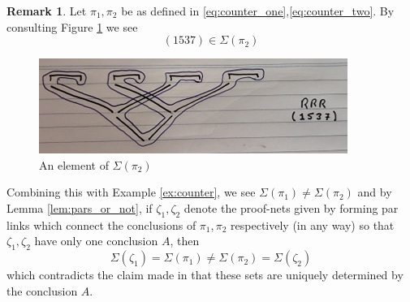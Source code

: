 \documentclass[12pt]{article}
\theoremstyle{plain}
\theoremstyle{definition}
\newtheorem{remark}[thm]{Remark}
\begin{document}
\begin{remark}
Let $\pi_1,\pi_2$ be as defined in \eqref{eq:counter_one},\eqref{eq:counter_two}. By consulting Figure \ref{fig:counter_two} we see
\begin{equation}
    (1537) \in \Sigma(\pi_2)
\end{equation}
\begin{figure}[h]
    \centering
    \includegraphics{counter_two.jpg}
    \caption{An element of $\Sigma(\pi_2)$}
    \label{fig:counter_two}
\end{figure}
Combining this with Example \ref{ex:counter}, we see $\Sigma(\pi_1) \neq \Sigma(\pi_2)$ and by Lemma \ref{lem:pars_or_not}, if $\zeta_1,\zeta_2$ denote the proof-nets given by forming par links which connect the conclusions of $\pi_1,\pi_2$ respectively (in any way) so that $\zeta_1,\zeta_2$ have only one conclusion $A$, then
\begin{equation}
    \Sigma(\zeta_1) = \Sigma(\pi_1) \neq \Sigma(\pi_2) = \Sigma(\zeta_2)
\end{equation}
which contradicts the claim made in \cite[\S 4.1]{multiplicatives} that these sets are uniquely determined by the conclusion $A$.
\end{remark}
\end{document}

